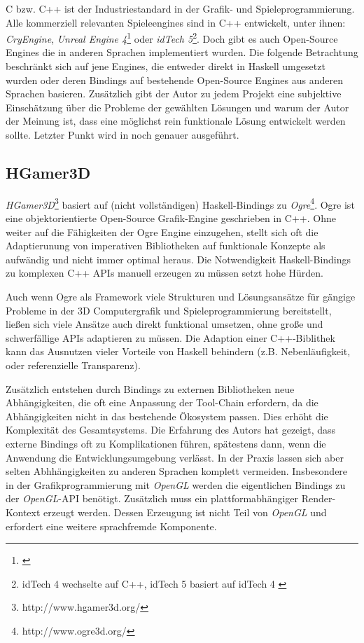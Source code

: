 C bzw. C++ ist der Industriestandard in der Grafik- und Spieleprogrammierung. Alle kommerziell relevanten Spieleengines sind in C++ entwickelt, unter ihnen: \textit{CryEngine}, \textit{Unreal Engine 4}\footnote{\cite{EpicGames2014}} oder \textit{idTech 5}\footnote{idTech 4 wechselte auf C++, idTech 5 basiert auf idTech 4 \parencite{IdSoftware2011}}. Doch gibt es auch Open-Source Engines die in anderen Sprachen implementiert wurden. Die folgende Betrachtung beschränkt sich auf jene Engines, die entweder direkt in Haskell umgesetzt wurden oder deren Bindings auf bestehende Open-Source Engines aus anderen Sprachen basieren. Zusätzlich gibt der Autor zu jedem Projekt eine subjektive Einschätzung über die Probleme der gewählten Lösungen und warum der Autor der Meinung ist, dass eine möglichst rein funktionale Lösung entwickelt werden sollte. Letzter Punkt wird in  noch genauer ausgeführt.

\subsection{HGamer3D}

\textit{HGamer3D}\footnote{http://www.hgamer3d.org/} basiert auf (nicht vollständigen) Haskell-Bindings zu \textit{Ogre}\footnote{http://www.ogre3d.org/}. Ogre ist eine objektorientierte Open-Source Grafik-Engine geschrieben in C++. Ohne weiter auf die Fähigkeiten der Ogre Engine einzugehen, stellt sich oft die Adaptierunung von imperativen Bibliotheken auf funktionale Konzepte als aufwändig und nicht immer optimal heraus. Die Notwendigkeit Haskell-Bindings zu komplexen C++ \acsp{API} manuell erzeugen zu müssen setzt hohe Hürden.

Auch wenn Ogre als Framework viele Strukturen und Lösungsansätze für gängige Probleme in der 3D Computergrafik und Spieleprogrammierung bereitstellt, ließen sich viele Ansätze auch direkt funktional umsetzen, ohne große und schwerfällige \acsp{API} adaptieren zu müssen. Die Adaption einer C++-Biblithek kann das Ausnutzen vieler Vorteile von Haskell behindern (z.B. Nebenläufigkeit, oder referenzielle Transparenz).

Zusätzlich entstehen durch Bindings zu externen Bibliotheken neue Abhängigkeiten, die oft eine Anpassung der Tool-Chain erfordern, da die Abhängigkeiten nicht in das bestehende Ökosystem passen. Dies erhöht die Komplexität des Gesamtsystems. Die Erfahrung des Autors hat gezeigt, dass externe Bindings oft zu Komplikationen führen, spätestens dann, wenn die Anwendung die Entwicklungsumgebung verlässt. In der Praxis lassen sich aber selten Abhhängigkeiten zu anderen Sprachen komplett vermeiden. Insbesondere in der Grafikprogrammierung mit \textit{OpenGL} werden die eigentlichen Bindings zu der \textit{OpenGL}-API benötigt. Zusätzlich muss ein plattformabhängiger Render-Kontext erzeugt werden. Dessen Erzeugung ist nicht Teil von \textit{OpenGL} und erfordert eine weitere sprachfremde Komponente.

